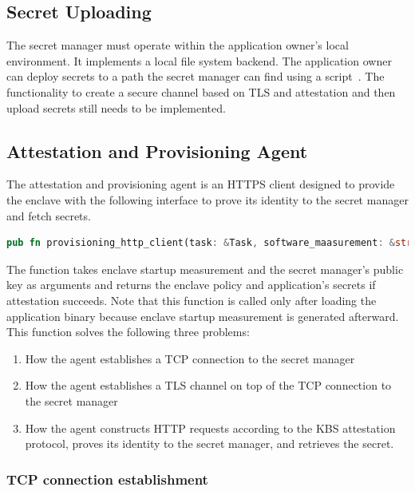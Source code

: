 \subsection{Secret Uploading}
The secret manager must operate within the application owner's local environment. It implements a local file system backend. The application owner can deploy secrets to a path the secret manager can find using a script~\cite*{secret_uploading_script}. The functionality to create a secure channel 
based on TLS and attestation and then upload secrets still needs to be implemented.

\subsection{Attestation and Provisioning Agent}
The attestation and provisioning agent is an HTTPS client designed to provide the enclave with the following interface to prove its identity to the secret manager and fetch secrets.

\begin{lstlisting}[language=rust, caption= API of the atestation and provisioning agent]
    pub fn provisioning_http_client(task: &Task, software_maasurement: &str, sm_cert: Vec<u8>) -> Result<(KbsPolicy, KbsSecrets)>
\end{lstlisting}

The function takes enclave startup measurement and the secret manager’s public key as arguments and returns the enclave policy and application’s secrets if attestation succeeds. Note that this function is called only after loading the application binary because enclave startup measurement is 
generated afterward. This function solves the following three problems:

\begin{enumerate}
    \item How the agent establishes a TCP connection to the secret manager
    \item How the agent establishes a TLS channel on top of the TCP connection to the secret manager
    \item How the agent constructs HTTP requests according to the KBS attestation protocol, proves its identity to the secret manager, and retrieves the secret.
\end{enumerate}

\subsubsection{TCP connection establishment}

